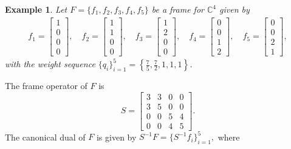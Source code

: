 \documentclass[final,1p,times]{elsarticle}
\newtheorem{example}[thm]{Example}
\begin{document}
\begin{example}
Let $F = \{f_1,f_2,f_3, f_4, f_5\}$ be a frame for $\mathbb{C}^4$ given by
\[
\begin{aligned}
f_1 = \begin{bmatrix} 1 \\ 0 \\ 0 \\ 0 \end{bmatrix}, \quad
f_2 = \begin{bmatrix} 1 \\ 1 \\ 0 \\ 0 \end{bmatrix}, \quad
f_3 = \begin{bmatrix} 1 \\ 2 \\ 0 \\ 0 \end{bmatrix}, \quad
f_4 = \begin{bmatrix} 0 \\ 0 \\ 1 \\ 2 \end{bmatrix}, \quad
f_5 = \begin{bmatrix} 0 \\ 0 \\ 2 \\ 1 \end{bmatrix},
\end{aligned}
\]
with the weight sequence $\{q_i\}_{i=1}^5 = \left\{ \frac{7}{5}, \frac{7}{2}, 1, 1, 1 \right\}$.
\end{example}
The frame operator of $F$ is
\[
S = \begin{bmatrix}
3 & 3 & 0 & 0 \\
3 & 5 & 0 & 0 \\
0 & 0 & 5 & 4 \\
0 & 0 & 4 & 5
\end{bmatrix}.
\]
The canonical dual of $F$ is given by $S^{-1}F = \{S^{-1}f_i\}_{i=1}^5,$ where
\end{document}
